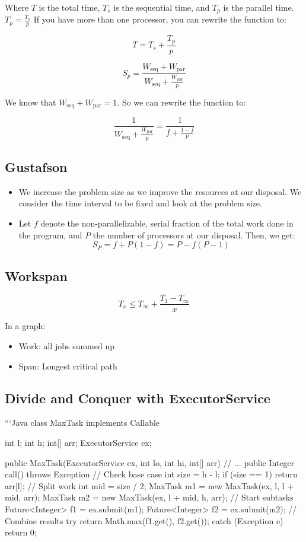 \documentclass{article}
\begin{document}
Where \(T\) is the total time, \(T_s\) is the sequential time, and \(T_p\) is the parallel time. \(T_p = \frac{T_s}{p}\) If you have more than one processor, you can rewrite the function to:

\[T = T_s + \frac{T_p}{p}\]

\[S_p = \frac{W_{\text{seq}} + W_{\text{par}}}{W_{\text{seq}} + \frac{W_{\text{par}}}{p}}\]

We know that \(W_{\text{seq}} + W_{\text{par}} = 1\). So we can rewrite the function to:

\[\frac{1}{W_{\text{seq}} + \frac{W_{\text{par}}}{p}} = \frac{1}{f + \frac{1-f}{p}}\]

\subsection{Gustafson}

\begin{itemize}
    \item We increase the problem size as we improve the resources at our disposal. We consider the time interval to be fixed and look at the problem size.
    \item Let \(f\) denote the non-parallelizable, serial fraction of the total work done in the program, and \(P\) the number of processors at our disposal. Then, we get:
    \[S_P = f + P(1 - f) = P - f(P - 1)\]
\end{itemize}

\subsection{Workspan}

\[T_x \leq T_\infty + \frac{T_1 - T_\infty}{x}\]

In a graph:

\begin{itemize}
    \item Work: all jobs summed up
    \item Span: Longest critical path
\end{itemize}

\subsection{Divide and Conquer with ExecutorService}

```Java
class MaxTask implements Callable  {
    int l;
    int h;
    int[] arr;
    ExecutorService ex;

    public MaxTask(ExecutorService ex, int lo, int hi, int[] arr) {
       // ...
    }
    public Integer call() throws Exception {
        // Check base case
        int size = h - l;
        if (size == 1) {
            return arr[l];
        }
        // Split work
        int mid = size / 2;
        MaxTask m1 = new MaxTask(ex, l, l + mid, arr);
        MaxTask m2 = new MaxTask(ex, l + mid, h, arr);
        // Start subtasks
        Future<Integer> f1 = ex.submit(m1);
        Future<Integer> f2 = ex.submit(m2);
        // Combine results
        try {
            return Math.max(f1.get(), f2.get());
        } catch (Exception e) {
            return 0;
        }
    }
}
\end{document}
